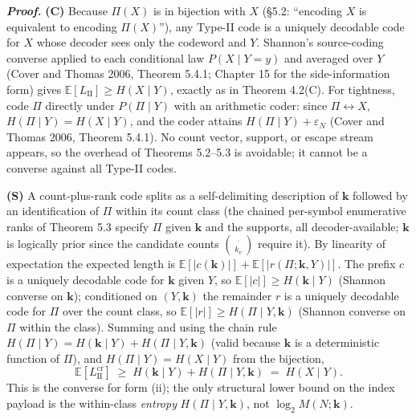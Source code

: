 \documentclass[
]{article}
\begin{document}
\emph{\textbf{Proof.}} \textbf{(C)} Because $\Pi(X)$ is in bijection
with $X$ (§5.2: ``encoding $X$ is equivalent to encoding $\Pi(X)$''),
any Type-II code is a uniquely decodable code for $X$ whose decoder
sees only the codeword and $Y$. Shannon's source-coding converse
applied to each conditional law $P(X \mid Y = y)$ and averaged over $Y$
(Cover and Thomas 2006, Theorem 5.4.1; Chapter 15 for the
side-information form) gives $\mathbb{E}[L_{\mathrm{II}}] \geq H(X \mid Y)$,
exactly as in Theorem 4.2(C). For tightness, code $\Pi$ directly under
$P(\Pi \mid Y)$ with an arithmetic coder: since $\Pi \leftrightarrow X$,
$H(\Pi \mid Y) = H(X \mid Y)$, and the coder attains
$H(\Pi \mid Y) + \varepsilon_N$ (Cover and Thomas 2006, Theorem 5.4.1).
No count vector, support, or escape stream appears, so the overhead of
Theorems 5.2--5.3 is avoidable; it cannot be a converse against all
Type-II codes.

\textbf{(S)} A count-plus-rank code splits as a self-delimiting
description of $\mathbf{k}$ followed by an identification of $\Pi$ within
its count class (the chained per-symbol enumerative ranks of Theorem 5.3
specify $\Pi$ given $\mathbf{k}$ and the supports, all decoder-available;
$\mathbf{k}$ is logically prior since the candidate counts $\binom{\cdot}{k_v}$
require it). By linearity of expectation the expected length is
$\mathbb{E}[|c(\mathbf{k})|] + \mathbb{E}[|r(\Pi;\mathbf{k},Y)|]$. The
prefix $c$ is a uniquely decodable code for $\mathbf{k}$ given $Y$, so
$\mathbb{E}[|c|] \geq H(\mathbf{k} \mid Y)$ (Shannon converse on
$\mathbf{k}$); conditioned on $(Y, \mathbf{k})$ the remainder $r$ is a
uniquely decodable code for $\Pi$ over the count class, so
$\mathbb{E}[|r|] \geq H(\Pi \mid Y, \mathbf{k})$ (Shannon converse on
$\Pi$ within the class). Summing and using the chain rule
$H(\Pi \mid Y) = H(\mathbf{k} \mid Y) + H(\Pi \mid Y, \mathbf{k})$
(valid because $\mathbf{k}$ is a deterministic function of $\Pi$), and
$H(\Pi \mid Y) = H(X \mid Y)$ from the bijection,
\[
\mathbb{E}[L_{\mathrm{II}}^{\mathrm{cr}}] \;\geq\; H(\mathbf{k} \mid Y) + H(\Pi \mid Y, \mathbf{k}) \;=\; H(X \mid Y).
\]
This is the converse for form (ii); the only structural lower bound on
the index payload is the within-class \emph{entropy}
$H(\Pi \mid Y, \mathbf{k})$, not $\log_2 M(N;\mathbf{k})$.
\end{document}
